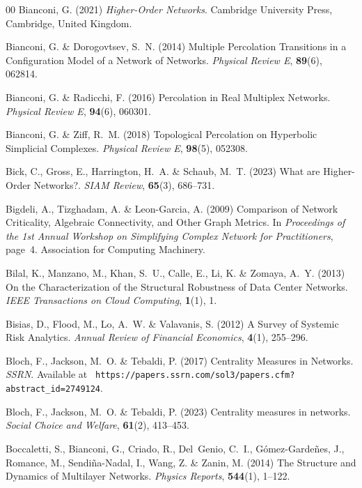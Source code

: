 \documentclass{comnet-mod}
\begin{document}
\begin{thebibliography}{00}
Bianconi, G. (2021) {\em {Higher-Order Networks}}.
Cambridge University Press, {Cambridge, United Kingdom}.

Bianconi, G. {\&} Dorogovtsev, S.~N. (2014)  {Multiple Percolation Transitions
  in a Configuration Model of a Network of Networks}. {\em {Physical Review
  E}}, \textbf{89}(6), 062814.

Bianconi, G. {\&} Radicchi, F. (2016)  {Percolation in Real Multiplex
  Networks}. {\em {Physical Review E}}, \textbf{94}(6), 060301.

Bianconi, G. {\&} Ziff, R.~M. (2018)  {Topological Percolation on Hyperbolic
  Simplicial Complexes}. {\em {Physical Review E}}, \textbf{98}(5), 052308.

Bick, C., Gross, E., Harrington, H.~A. {\&} Schaub, M.~T. (2023)  What are
  Higher-Order Networks?. {\em SIAM Review}, \textbf{65}(3), 686--731.

Bigdeli, A., Tizghadam, A. {\&} {Leon-Garcia}, A. (2009)  {Comparison of
  Network Criticality, Algebraic Connectivity, and Other Graph Metrics}. In
  {\em {Proceedings of the 1st Annual Workshop on Simplifying Complex Network
  for Practitioners}}, page~4. {Association for Computing Machinery}.

Bilal, K., Manzano, M., Khan, S.~U., Calle, E., Li, K. {\&} Zomaya, A.~Y.
  (2013)  {On the Characterization of the Structural Robustness of Data Center
  Networks}. {\em {IEEE Transactions on Cloud Computing}}, \textbf{1}(1), 1.

Bisias, D., Flood, M., Lo, A.~W. {\&} Valavanis, S. (2012)  {A Survey of
  Systemic Risk Analytics}. {\em {Annual Review of Financial Economics}},
  \textbf{4}(1), 255--296.

Bloch, F., Jackson, M.~O. {\&} Tebaldi, P. (2017)  {Centrality Measures in
  Networks}. {\em {SSRN}}.
Available at {\tt
  https://papers.ssrn.com/sol3/papers.cfm?abstract\_id=2749124}.

Bloch, F., Jackson, M.~O. {\&} Tebaldi, P. (2023)  Centrality measures in
  networks. {\em {Social Choice and Welfare}}, \textbf{61}(2), 413--453.

Boccaletti, S., Bianconi, G., Criado, R., Del~Genio, C.~I.,
  {G{\'o}mez-Garde\~{n}es}, J., Romance, M., {Sendi\~{n}a-Nadal}, I., Wang, Z.
  {\&} Zanin, M. (2014)  {The Structure and Dynamics of Multilayer Networks}.
  {\em {Physics Reports}}, \textbf{544}(1), 1--122.


\end{thebibliography}
\end{document}
